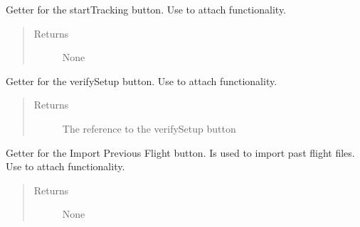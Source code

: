 \documentclass[letterpaper,10pt,english]{sphinxmanual}
\begin{document}
\begin{fulllineitems}
\begin{fulllineitems}
\label{\detokenize{index:src.Views.View_StartupScreen.StartupWindow.BtnStart}}
Getter for the startTracking button. Use to attach functionality.
\begin{quote}\begin{description}
\item[{Returns}] \leavevmode
None

\end{description}\end{quote}

\end{fulllineitems}


\begin{fulllineitems}
\label{\detokenize{index:src.Views.View_StartupScreen.StartupWindow.BtnVerifySetup}}
Getter for the verifySetup button. Use to attach functionality.
\begin{quote}\begin{description}
\item[{Returns}] \leavevmode
The reference to the verifySetup button

\end{description}\end{quote}

\end{fulllineitems}


\begin{fulllineitems}
\label{\detokenize{index:src.Views.View_StartupScreen.StartupWindow.del_BtnImport}}
Getter for the Import Previous Flight button. Is used to import past flight files. Use to attach functionality.
\begin{quote}\begin{description}
\item[{Returns}] \leavevmode
None


\end{description}
\end{quote}
\end{fulllineitems}
\end{fulllineitems}
\end{document}
